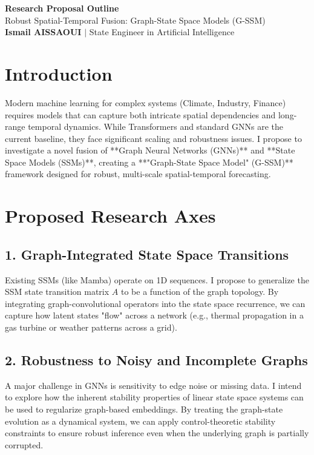 \documentclass[11pt,a4paper]{article}
\begin{document}
\begin{center}
    {\LARGE\bfseries\color{tumblue} Research Proposal Outline}\\[6pt]
    {\large Robust Spatial-Temporal Fusion: Graph-State Space Models (G-SSM)}\\[4pt]
    \textbf{Ismail AISSAOUI} $|$ State Engineer in Artificial Intelligence
\end{center}

\bigskip

\section{Introduction}
Modern machine learning for complex systems (Climate, Industry, Finance) requires models that can capture both intricate spatial dependencies and long-range temporal dynamics. While Transformers and standard GNNs are the current baseline, they face significant scaling and robustness issues. I propose to investigate a novel fusion of **Graph Neural Networks (GNNs)** and **State Space Models (SSMs)**, creating a **"Graph-State Space Model" (G-SSM)** framework designed for robust, multi-scale spatial-temporal forecasting.

\section{Proposed Research Axes}

\subsection{1. Graph-Integrated State Space Transitions}
Existing SSMs (like Mamba) operate on 1D sequences. I propose to generalize the SSM state transition matrix $A$ to be a function of the graph topology. By integrating graph-convolutional operators into the state space recurrence, we can capture how latent states "flow" across a network (e.g., thermal propagation in a gas turbine or weather patterns across a grid).

\subsection{2. Robustness to Noisy and Incomplete Graphs}
A major challenge in GNNs is sensitivity to edge noise or missing data. I intend to explore how the inherent stability properties of linear state space systems can be used to regularize graph-based embeddings. By treating the graph-state evolution as a dynamical system, we can apply control-theoretic stability constraints to ensure robust inference even when the underlying graph is partially corrupted.
\end{document}
